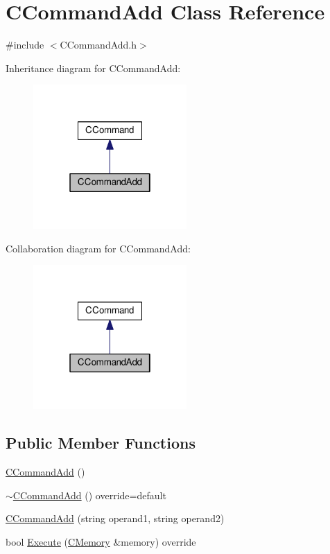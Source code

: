 \hypertarget{classCCommandAdd}{}\section{C\+Command\+Add Class Reference}
\label{classCCommandAdd}


{\ttfamily \#include $<$C\+Command\+Add.\+h$>$}



Inheritance diagram for C\+Command\+Add\+:\nopagebreak
\begin{figure}[H]
\begin{center}
\leavevmode
\includegraphics[width=166pt]{classCCommandAdd__inherit__graph}
\end{center}
\end{figure}


Collaboration diagram for C\+Command\+Add\+:\nopagebreak
\begin{figure}[H]
\begin{center}
\leavevmode
\includegraphics[width=166pt]{classCCommandAdd__coll__graph}
\end{center}
\end{figure}
\subsection*{Public Member Functions}
\begin{DoxyCompactItemize}
\item 
\hyperlink{classCCommandAdd_a41bc29d57d43751ff561d0c9092d57cd}{C\+Command\+Add} ()
\item 
\hyperlink{classCCommandAdd_af5ae9f4e2187aa9cea5c052621a2d5f6}{$\sim$\+C\+Command\+Add} () override=default
\item 
\hyperlink{classCCommandAdd_a40c2fa07a479459ed99910b87364f234}{C\+Command\+Add} (string operand1, string operand2)
\item 
bool \hyperlink{classCCommandAdd_a1280a1d17ef3465668a7de11fa712554}{Execute} (\hyperlink{classCMemory}{C\+Memory} \&memory) override
\end{DoxyCompactItemize}
